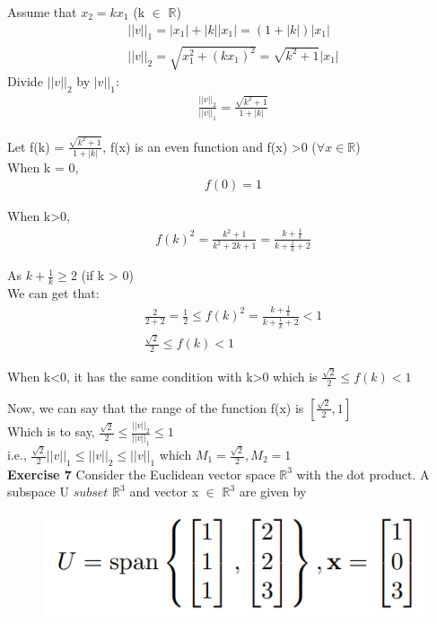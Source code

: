 \documentclass{article}
\begin{document}
Assume that $x_2 = kx_1$ (k $\in$ $\mathbb{R}$)\\
\begin{gather}
	||v||_1 = |x_1| + |k| |x_1| = (1+ |k|)|x_1|\\
	||v||_2 =  \sqrt{x_1^2 + (kx_1)^2} = \sqrt{k^2 + 1}|x_1| 
\end{gather}
Divide $||v||_2$ by $|v||_1$:\\

\begin{gather}
	\frac{||v||_2}{||v||_1} = \frac{\sqrt{k^2 + 1}}{1 + |k|}
\end{gather}

Let f(k) = $\frac{\sqrt{k^2 + 1}}{1 + |k|}$, f(x) is an even function and f(x) >0 ($\forall x \in \mathbb{R} $) \\
When k = 0,
\begin{gather}
 f(0) = 1
\end{gather}

When k>0, 
\begin{gather}
f(k)^2 = \frac{k^2+1}{k^2 + 2k + 1} = \frac{k+\frac{1}{k}}{k+\frac{1}{k} + 2}
\end{gather}

As $k+\frac{1}{k} \geq 2$ (if k > 0)\\
We can get that:\\
\begin{gather}
	\frac{2}{2+2} = \frac{1}{2} \leq f(k)^2 = \frac{k+\frac{1}{k}}{k+\frac{1}{k} + 2} < 1\\
	\frac{\sqrt{2}}{2} \leq f(k) < 1
\end{gather}

When k<0, it has the same condition with k>0 which is $\frac{\sqrt{2}}{2} \leq f(k) < 1$

Now, we can say that the range of the function f(x) is $[\frac{\sqrt{2}}{2},1]$\\

Which is to say, $\frac{\sqrt{2}}{2} \leq \frac{||v||_2}{||v||_1} \leq 1$\\

i.e.,  $\frac{\sqrt{2}}{2} ||v||_1 \leq ||v||_2 \leq ||v||_1$ which $M_1 = \frac{\sqrt{2}}{2}, M_2 = 1$\\

\textbf{Exercise 7}
Consider the Euclidean vector space $\mathbb{R}^3$ with the dot product. A subspace U $subset$ $\mathbb{R}^3$ and vector x $\in$ $\mathbb{R}^3$ are given by
\begin{figure}[H]
  \includegraphics[width = \linewidth] {7a.png}
\end{figure}
\end{document}

